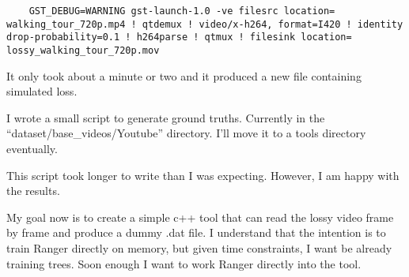 \documentclass[12pt,oneside]{book}
\begin{document}
  \begin{lstlisting}
    GST_DEBUG=WARNING gst-launch-1.0 -ve filesrc location= walking_tour_720p.mp4 ! qtdemux ! video/x-h264, format=I420 ! identity drop-probability=0.1 ! h264parse ! qtmux ! filesink location= lossy_walking_tour_720p.mov \end{lstlisting}

  It only took about a minute or two and it produced a new file containing simulated loss.

  I wrote a small script to generate ground truths. Currently in the ``dataset/base\_videos/Youtube'' directory.
  I'll move it to a tools directory eventually. 

  This script took longer to write than I was expecting. However, I am happy with the results.

  My goal now is to create a simple c++ tool that can read the lossy video frame by frame and produce a dummy .dat file. I understand that the intention is to train Ranger directly on memory, but given time constraints, I want be already training trees. Soon enough I want to work Ranger directly into the tool.
\end{document}
